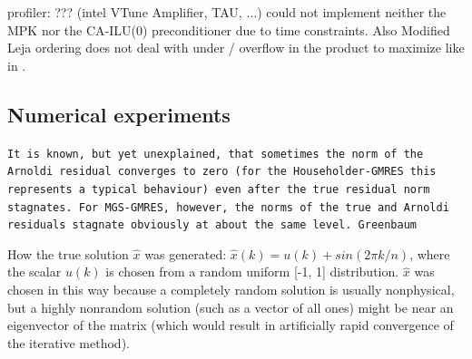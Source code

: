 \documentclass{scrartcl}
\numberwithin{equation}{section}
\begin{document}
 profiler: ??? (intel VTune Amplifier, TAU, $\ldots$) could not implement neither the MPK nor the CA-ILU(0) preconditioner due to time constraints. Also Modified Leja ordering does not deal with under / overflow in the product to maximize like in \cite{Hoemmen:2010:CKS:1970638}.
\subsection{Numerical experiments}
\texttt{It is known, but yet unexplained, that sometimes the norm of the Arnoldi residual converges to zero (for the Householder-GMRES this represents a typical behaviour) even after the true residual norm stagnates. For MGS-GMRES, however, the norms of the true and Arnoldi residuals stagnate obviously at about the same level. Greenbaum~\cite{Greenbaum97numericalbehaviour}}

How the true solution $\hat{x}$ was generated: $\hat{x}(k) = u(k) + sin(2\pi k/n)$,
where the scalar $u(k)$ is chosen from a random uniform [-1, 1] distribution. 
$\hat{x}$ was chosen in this way because a completely random solution is usually nonphysical, but a highly nonrandom solution (such as a vector of all ones) might be near an eigenvector of the matrix (which would result in artificially rapid convergence of the iterative method).
\end{document}

